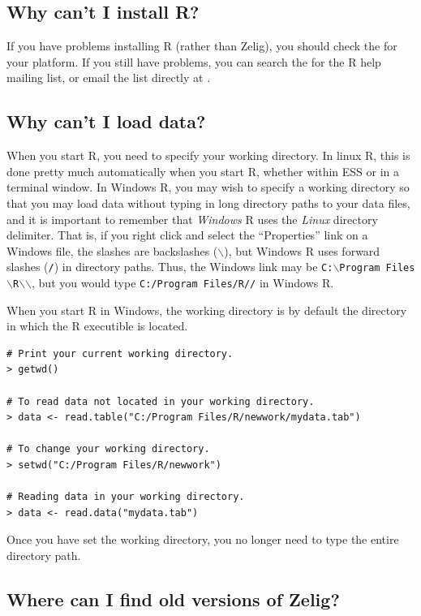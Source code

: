 \subsection*{Why can't I install R?}

If you have problems installing R (rather than Zelig), you should
check the  for your
platform.  If you still have problems, you can search the
for the R help mailing list, or email the list directly at
.  

\subsection*{Why can't I load data?}

When you start R, you need to specify your working directory.  In
linux R, this is done pretty much automatically when you start R,
whether within ESS or in a terminal window.  In Windows R, you may
wish to specify a working directory so that you may load data without
typing in long directory paths to your data files, and it is important
to remember that \emph{Windows} R uses the \emph{Linux} directory
delimiter. That is, if you right click and select the ``Properties''
link on a Windows file, the slashes are backslashes ($\backslash$), but Windows R 
uses forward slashes ({\tt /}) in directory paths.  Thus, the Windows
link may be {\tt C:$\backslash$Program Files$\backslash$R$\backslash$\rwvers$\backslash$}, but you would type
 {\tt C:/Program Files/R/\rwvers/} in Windows R.

When you start R in Windows, the working directory is by default the
directory in which the R executible is located.
\begin{verbatim}
# Print your current working directory.  
> getwd()                                    

# To read data not located in your working directory. 
> data <- read.table("C:/Program Files/R/newwork/mydata.tab")

# To change your working directory.  
> setwd("C:/Program Files/R/newwork")

# Reading data in your working directory.
> data <- read.data("mydata.tab")
\end{verbatim}
Once you have set the working directory, you no longer need to type
the entire directory path.  

\subsection*{Where can I find old versions of Zelig?} 

